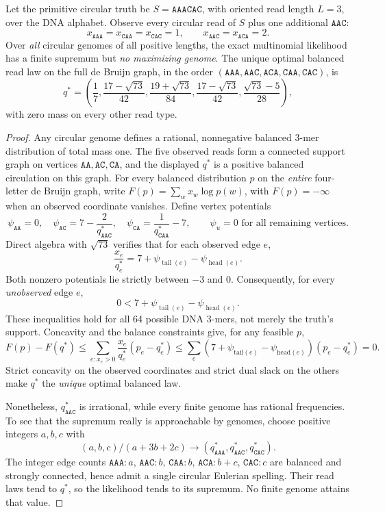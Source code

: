 \begin{theorem}
\label{thm:unattained-ML}
Let the primitive circular truth be $S=\texttt{AAACAC}$, with
oriented read length $L=3$, over the DNA alphabet. Observe every
circular read of $S$ plus one additional $\texttt{AAC}$:
\[
 x_{\texttt{AAA}}=x_{\texttt{CAA}}=x_{\texttt{CAC}}=1,\qquad
 x_{\texttt{AAC}}=x_{\texttt{ACA}}=2.
\]
Over \emph{all} circular genomes of all positive lengths,
the exact multinomial likelihood has a finite supremum
but \emph{no maximizing genome}.
The unique optimal balanced read law on the full de Bruijn
graph, in the order
$(\texttt{AAA},\texttt{AAC},\texttt{ACA},
\texttt{CAA},\texttt{CAC})$, is
\[
 q^*=\left(\frac17,\frac{17-\sqrt{73}}{42},
           \frac{19+\sqrt{73}}{84},
           \frac{17-\sqrt{73}}{42},
           \frac{\sqrt{73}-5}{28}\right),
\]
with zero mass on every other read type.
\end{theorem}
\begin{proof}
Any circular genome defines a rational, nonnegative balanced
3-mer distribution of total mass one. The five observed reads
form a connected support graph on vertices
$\texttt{AA},\texttt{AC},\texttt{CA}$, and the displayed
$q^*$ is a positive balanced circulation on this graph.
For every balanced distribution $p$ on the \emph{entire}
four-letter de Bruijn graph, write
$F(p)=\sum_w x_w\log p(w)$, with $F(p)=-\infty$ when
an observed coordinate vanishes.
Define vertex potentials
\[
 \psi_{\texttt{AA}}=0,\quad
 \psi_{\texttt{AC}}=7-\frac2{q^*_{\texttt{AAC}}},\quad
 \psi_{\texttt{CA}}=\frac1{q^*_{\texttt{CAA}}}-7,
 \qquad \psi_u=0\text{ for all remaining vertices}.
\]
Direct algebra with $\sqrt{73}$ verifies that for
each observed edge $e$,
\[
   \frac{x_e}{q^*_e}=7+\psi_{\operatorname{tail}(e)}
                        -\psi_{\operatorname{head}(e)}.
\]
Both nonzero potentials lie strictly between $-3$ and $0$.
Consequently, for every \emph{unobserved} edge $e$,
\[
   0<7+\psi_{\operatorname{tail}(e)}
           -\psi_{\operatorname{head}(e)}.
\]
These inequalities hold for all 64 possible DNA 3-mers,
not merely the truth's support. Concavity and the balance
constraints give, for any feasible $p$,
\[
 F(p)-F(q^*)\le
   \sum_{e:x_e>0}\frac{x_e}{q^*_e}(p_e-q^*_e)
 \le \sum_e (7+\psi_{\mathrm{tail}(e)}
                     -\psi_{\mathrm{head}(e)})(p_e-q^*_e)=0 .
\]
Strict concavity on the observed coordinates and strict
dual slack on the others make $q^*$ the \emph{unique}
optimal balanced law.

Nonetheless, $q^*_{\texttt{AAC}}$ is irrational, while
every finite genome has rational frequencies. To see that
the supremum really is approachable by genomes, choose
positive integers $a,b,c$ with
\[
 (a,b,c)/(a+3b+2c)\longrightarrow
 (q^*_{\texttt{AAA}},q^*_{\texttt{AAC}},
  q^*_{\texttt{CAC}}).
\]
The integer edge counts
$\texttt{AAA}:a$,
$\texttt{AAC}:\!b$,
$\texttt{CAA}:\!b$,
$\texttt{ACA}:\!b+c$,
$\texttt{CAC}:\!c$
are balanced and strongly connected, hence admit a
single circular Eulerian spelling. Their read laws tend
to $q^*$, so the likelihood tends to its supremum.
No finite genome attains that value.
\end{proof}

